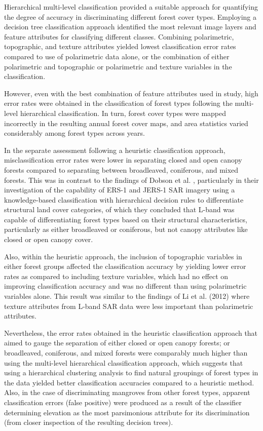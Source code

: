 Hierarchical multi-level classification provided a suitable approach for quantifying the degree of accuracy in discriminating different forest cover types. Employing a decision tree classification approach identified the most relevant image layers and feature attributes for classifying different classes. Combining polarimetric, topographic, and texture attributes yielded lowest classification error rates compared to use of polarimetric data alone, or the combination of either polarimetric and topographic or polarimetric and texture variables in the classification.

However, even with the best combination of feature attributes used in study, high error rates were obtained in the classification of forest types following the multi-level hierarchical classification. In turn, forest cover types were mapped incorrectly in the resulting annual forest cover maps, and area statistics varied considerably among forest types across years.

In the separate assessment following a heuristic classification approach, misclassification error rates were lower in separating closed and open canopy forests compared to separating between broadleaved, coniferous, and mixed forests. This was in contrast to the findings of Dobson et al. \citeyearpar{dobson_knowledge-based_1996}, particularly in their investigation of the capability of ERS-1 and JERS-1 SAR imagery using a knowledge-based classification with hierarchical decision rules to differentiate structural land cover categories, of which they concluded that L-band was capable of differentiating forest types based on their structural characteristics, particularly as either broadleaved or coniferous, but not canopy attributes like closed or open canopy cover.

Also, within the heuristic approach, the inclusion of topographic variables in either forest groups affected the classification accuracy by yielding lower error rates as compared to including texture variables, which had no effect on improving classification accuracy and was no different than using polarimetric variables alone. This result was similar to the findings of Li et al. (2012) where texture attributes from L-band SAR data were less important than polarimetric attributes.

Nevertheless, the error rates obtained in the heuristic classification approach that aimed to gauge the separation of either closed or open canopy forests; or broadleaved, coniferous, and mixed forests were comparably much higher than using the multi-level hierarchical classification approach, which suggests that using a hierarchical clustering analysis to find natural groupings of forest types in the data yielded better classification accuracies compared to a heuristic method. Also, in the case of discriminating mangroves from other forest types, apparent classification errors (false positive) were produced as a result of the classifier determining elevation as the most parsimonious attribute for its discrimination (from closer inspection of the resulting decision trees).

